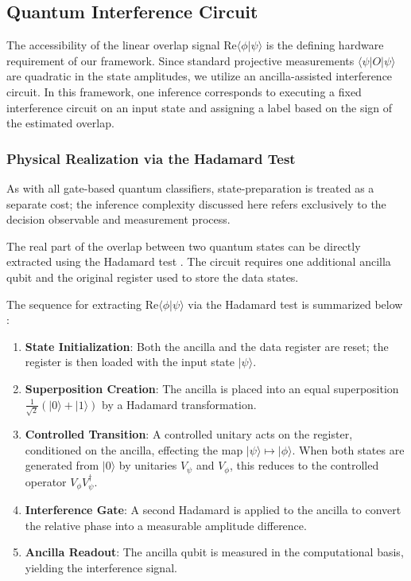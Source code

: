 \documentclass[conference]{IEEEtran}
\begin{document}
\subsection{Quantum Interference Circuit}
The accessibility of the linear overlap signal $\mathrm{Re}\langle \phi | \psi \rangle$ is the defining hardware requirement of our framework. Since standard projective measurements $\langle \psi | O | \psi \rangle$ are quadratic in the state amplitudes, we utilize an ancilla-assisted interference circuit. In this framework, one inference corresponds to executing a fixed interference circuit on an input state and assigning a label based on the sign of the estimated overlap.

\subsubsection{Physical Realization via the Hadamard Test}
As with all gate-based quantum classifiers, state-preparation is treated as a separate cost; the inference complexity discussed here refers exclusively to the decision observable and measurement process.

The real part of the overlap between two quantum states can be directly extracted using the Hadamard test \cite{ekert2002direct}. The circuit requires one additional ancilla qubit and the original register used to store the data states.

The sequence for extracting $\mathrm{Re}\langle \phi | \psi \rangle$ via the Hadamard test is summarized below \cite{ekert2002direct}:
\begin{enumerate}
    \item \textbf{State Initialization}: Both the ancilla and the data register are reset; the register is then loaded with the input state $|\psi\rangle$.
    \item \textbf{Superposition Creation}: The ancilla is placed into an equal superposition $\frac{1}{\sqrt{2}}(|0\rangle + |1\rangle)$ by a Hadamard transformation.
    \item \textbf{Controlled Transition}: A controlled unitary acts on the register, conditioned on the ancilla, effecting the map $|\psi\rangle \mapsto |\phi\rangle$. When both states are generated from $|0\rangle$ by unitaries $V_\psi$ and $V_\phi$, this reduces to the controlled operator $V_\phi V_\psi^\dagger$.
    \item \textbf{Interference Gate}: A second Hadamard is applied to the ancilla to convert the relative phase into a measurable amplitude difference.
    \item \textbf{Ancilla Readout}: The ancilla qubit is measured in the computational basis, yielding the interference signal.
\end{enumerate}
\end{document}
